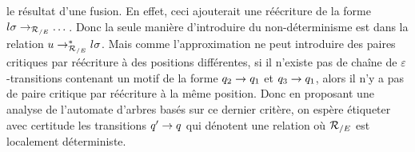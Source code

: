 \begin{itemize}
   le résultat d'une fusion. En effet, ceci ajouterait une réécriture de la forme $l\sigma \rightarrow_{{\mathcal R_{/E}}} \dots$.
   Donc la seule manière d'introduire du non-déterminisme est dans la relation $u \rightarrow_{{\mathcal R_{/E}}}^* l\sigma$.
   Mais comme l'approximation ne peut introduire des paires critiques par réécriture à des positions 
   différentes, si il n'existe pas de chaîne de $\varepsilon$-transitions contenant un motif de la
   forme $q_2 \rightarrow q_1$ et $q_3 \rightarrow q_1$, alors il n'y a pas de paire critique par réécriture à la même position.
   Donc en proposant une analyse de l'automate d'arbres basés sur ce dernier critère, on espère
   étiqueter avec certitude les transitions $q' \rightarrow q$ qui dénotent une relation où ${\mathcal R_{/E}}$ est localement déterministe.
 \end{itemize}



%



